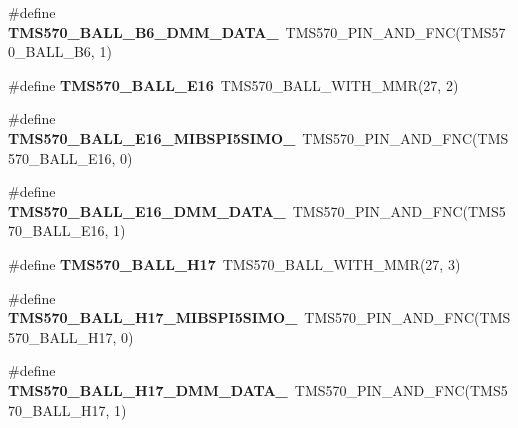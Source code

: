 \begin{DoxyCompactItemize}
\#define {\bfseries T\+M\+S570\+\_\+\+B\+A\+L\+L\+\_\+\+B6\+\_\+\+D\+M\+M\+\_\+\+D\+A\+T\+A\+\_}~T\+M\+S570\+\_\+\+P\+I\+N\+\_\+\+A\+N\+D\+\_\+\+F\+NC(T\+M\+S570\+\_\+\+B\+A\+L\+L\+\_\+\+B6, 1)
\item 
\mbox{\label{tms570ls3137zwt-pins_8h_abf4b089016f9be72c441402bec4e570b}} 
\#define {\bfseries T\+M\+S570\+\_\+\+B\+A\+L\+L\+\_\+\+E16}~T\+M\+S570\+\_\+\+B\+A\+L\+L\+\_\+\+W\+I\+T\+H\+\_\+\+M\+MR(27, 2)
\item 
\mbox{\label{tms570ls3137zwt-pins_8h_a70738574934e08b62b7e9ae4e03bb51a}} 
\#define {\bfseries T\+M\+S570\+\_\+\+B\+A\+L\+L\+\_\+\+E16\+\_\+\+M\+I\+B\+S\+P\+I5\+S\+I\+M\+O\+\_}~T\+M\+S570\+\_\+\+P\+I\+N\+\_\+\+A\+N\+D\+\_\+\+F\+NC(T\+M\+S570\+\_\+\+B\+A\+L\+L\+\_\+\+E16, 0)
\item 
\mbox{\label{tms570ls3137zwt-pins_8h_a121588438bb47b797fa17a23be1d0bb1}} 
\#define {\bfseries T\+M\+S570\+\_\+\+B\+A\+L\+L\+\_\+\+E16\+\_\+\+D\+M\+M\+\_\+\+D\+A\+T\+A\+\_}~T\+M\+S570\+\_\+\+P\+I\+N\+\_\+\+A\+N\+D\+\_\+\+F\+NC(T\+M\+S570\+\_\+\+B\+A\+L\+L\+\_\+\+E16, 1)
\item 
\mbox{\label{tms570ls3137zwt-pins_8h_a62be6f1e53c1a5df24a0725c7d51c5d6}} 
\#define {\bfseries T\+M\+S570\+\_\+\+B\+A\+L\+L\+\_\+\+H17}~T\+M\+S570\+\_\+\+B\+A\+L\+L\+\_\+\+W\+I\+T\+H\+\_\+\+M\+MR(27, 3)
\item 
\mbox{\label{tms570ls3137zwt-pins_8h_a3aa1316f1276c54a999ead8029e054b4}} 
\#define {\bfseries T\+M\+S570\+\_\+\+B\+A\+L\+L\+\_\+\+H17\+\_\+\+M\+I\+B\+S\+P\+I5\+S\+I\+M\+O\+\_}~T\+M\+S570\+\_\+\+P\+I\+N\+\_\+\+A\+N\+D\+\_\+\+F\+NC(T\+M\+S570\+\_\+\+B\+A\+L\+L\+\_\+\+H17, 0)
\item 
\mbox{\label{tms570ls3137zwt-pins_8h_a7c20056b246adec6184fa591c9e7d68a}} 
\#define {\bfseries T\+M\+S570\+\_\+\+B\+A\+L\+L\+\_\+\+H17\+\_\+\+D\+M\+M\+\_\+\+D\+A\+T\+A\+\_}~T\+M\+S570\+\_\+\+P\+I\+N\+\_\+\+A\+N\+D\+\_\+\+F\+NC(T\+M\+S570\+\_\+\+B\+A\+L\+L\+\_\+\+H17, 1)
\item 
\mbox{\label{tms570ls3137zwt-pins_8h_a7afe12f93d207f2ddef5df87e5229740}} 

\end{DoxyCompactItemize}
